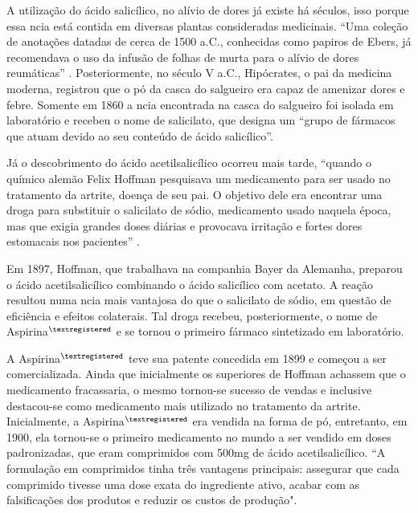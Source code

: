     A utilização do ácido salicílico, no alívio de dores já existe há séculos, isso porque essa ncia está
    contida em diversas plantas consideradas medicinais. “Uma coleção de anotações datadas de cerca de 1500
    a.C., conhecidas como papiros de Ebers, já recomendava o uso da infusão de folhas de murta para o alívio
    de dores reumáticas” \cite{aspirinabayer}. Posteriormente, no século V a.C., Hipócrates, o pai da medicina
    moderna, registrou que o pó da casca do salgueiro era capaz de amenizar dores e febre. Somente em 1860 a
    ncia encontrada na casca do salgueiro foi isolada em laboratório e recebeu o nome de salicilato, que
    designa um “grupo de fármacos que atuam devido ao seu conteúdo de ácido salicílico”. \cite{Goodman2005}

    Já o descobrimento do ácido acetilsalicílico ocorreu mais tarde, “quando o químico alemão
    Felix Hoffman pesquisava um medicamento para ser usado no tratamento da artrite, doença de seu pai. O
    objetivo dele era encontrar uma droga para substituir o salicilato de sódio, medicamento usado naquela
    época, mas que exigia grandes doses diárias e provocava irritação e fortes dores estomacais nos pacientes”
    \cite{massabni2006}.
    
    Em 1897, Hoffman, que trabalhava na companhia Bayer da Alemanha, preparou o ácido
    acetilsalicílico combinando o ácido salicílico com acetato. A reação resultou numa ncia mais vantajosa do
    que o salicilato de sódio, em questão de eficiência e efeitos colaterais. Tal droga recebeu,
    posteriormente, o nome de Aspirina$^{\tiny{\textregistered}}$ e se tornou o primeiro fármaco sintetizado
    em laboratório.  
    
    A Aspirina$^{\tiny{\textregistered}}$ teve sua patente concedida em 1899 e começou a ser comercializada.
    Ainda que inicialmente os superiores de Hoffman achassem que o medicamento fracassaria, o mesmo tornou-se
    sucesso de vendas e inclusive destacou-se como medicamento mais utilizado no tratamento da artrite.
    Inicialmente, a Aspirina$^{\tiny{\textregistered}}$
    era vendida na forma de pó, entretanto, em 1900, ela tornou-se o primeiro medicamento no mundo a ser
    vendido em doses padronizadas, que eram comprimidos com 500mg de ácido acetilsalicílico. “A formulação em
    comprimidos tinha três vantagens principais: assegurar que cada comprimido tivesse uma dose exata do
    ingrediente ativo, acabar com as falsificações dos produtos e reduzir os custos de
    produção".\cite{aspirinabayer}

